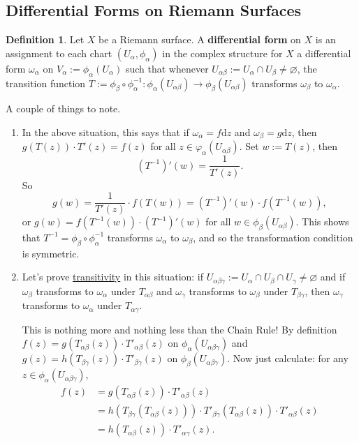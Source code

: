 \documentclass[12pt]{article}
\newcommand\inv[1]{#1^{-1}}
\newcommand{\paren}[1]{\left( #1 \right)}
\theoremstyle{definition}
\newtheorem{definition}[theorem]{Definition}
\theoremstyle{remark}
\begin{document}
\subsection{Differential Forms on Riemann Surfaces}
\begin{definition}
    Let $X$ be a Riemann surface. A \textbf{differential form} on $X$ is an assignment to each chart $\paren{ U_{\alpha} , \phi_{\alpha} }$ in the complex structure for $X$ a differential form $\omega_{\alpha}$ on $V_{\alpha} := \phi_{\alpha} \paren{ U_{\alpha} }$ such that whenever $U_{\alpha \beta} := U_{\alpha} \cap U_{\beta} \neq \varnothing$, the transition function $T := \phi_{\beta} \circ \inv{ \phi_{\alpha} } : \phi_{\alpha} \paren{ U_{\alpha \beta} } \to \phi_{\beta} \paren{ U_{\alpha \beta} }$ transforms $\omega_{\beta}$ to $\omega_{\alpha}$.
\end{definition}
A couple of things to note.
\begin{enumerate}
    \item In the above situation, this says that if $\omega_{\alpha} = f \mathrm{d}z$ and $\omega_{\beta} = g \mathrm{d}z$, then $g \paren{ T(z) } \cdot T'(z) = f(z)$ for all $z \in \varphi_{\alpha} \paren{ U_{\alpha \beta} }$. Set $w := T(z)$, then 
    \[
        \paren{ \inv{T} }'(w) = \frac{1}{T'(z)}.
    \]
    So 
    \[
        g(w) = \frac{1}{T'(z)} \cdot f \paren{ T(w) } = \paren{ \inv{T} }'(w) \cdot f \paren{ \inv{T}(w) },
    \]
    or $g(w) = f \paren{ \inv{T}(w) } \cdot \paren{ \inv{T} }'(w)$ for all $w \in \phi_{\beta} \paren{ U_{\alpha \beta} }$. This shows that $\inv{T} = \phi_{\beta} \circ \inv{\phi_{\alpha}}$ transforms $\omega_{\alpha}$ to $\omega_{\beta}$, and so the transformation condition is symmetric.
    \item Let's prove \underline{transitivity} in this situation: if $U_{\alpha \beta \gamma} := U_{\alpha} \cap U_{\beta} \cap U_{\gamma} \neq \varnothing$ and if $\omega_{\beta}$ transforms to $\omega_{\alpha}$ under $T_{\alpha \beta}$ and $\omega_{\gamma}$ transforms to $\omega_{\beta}$ under $T_{\beta \gamma}$, then $\omega_{\gamma}$ transforms to $\omega_{\alpha}$ under $T_{\alpha \gamma}$. 
    
    This is nothing more and nothing less than the Chain Rule! By definition $f(z) = g \paren{ T_{\alpha \beta} (z) } \cdot T'_{\alpha \beta} (z)$ on $\phi_{\alpha} \paren{ U_{\alpha \beta \gamma} }$ and $g(z) = h \paren{ T_{\beta \gamma} (z) } \cdot T'_{\beta \gamma}(z)$ on $\phi_{\beta} \paren{ U_{\alpha \beta \gamma } }$. Now just calculate: for any $z \in \phi_{\alpha} \paren{ U_{\alpha \beta \gamma} }$,
    \begin{align*}
        f(z) & = g \paren{ T_{\alpha \beta} (z) } \cdot T'_{\alpha \beta} (z) \\
        & = h \paren{ T_{\beta \gamma} \paren{ T_{\alpha \beta} (z) } } \cdot T'_{\beta \gamma} \paren{ T_{\alpha \beta} (z) } \cdot T'_{\alpha \beta} (z) \\
        & = h \paren{ T_{\alpha \beta}(z) } \cdot T'_{\alpha \gamma}(z).
    \end{align*}
\end{enumerate}
\end{document}
